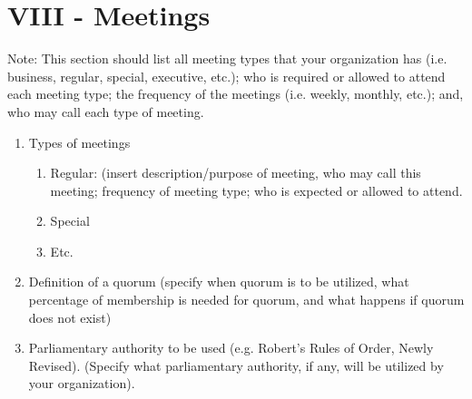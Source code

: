 \documentclass[11pt,a4paper,notitlepage]{article}
\begin{document}
\section*{VIII - Meetings}
Note:  This section should list all meeting types that your organization has
(i.e. business, regular, special, executive, etc.); who is required or allowed
to attend each meeting type; the frequency of the meetings (i.e. weekly,
monthly, etc.); and, who may call each type of meeting. 
\begin{enumerate}
  \item	Types of meetings
    \begin{enumerate}
      \item	Regular:  (insert description/purpose of meeting, who may call this
      meeting; frequency of meeting type; who is expected or allowed to attend.
      \item	Special
      \item	Etc.
    \end{enumerate}
  \item	Definition of a quorum (specify when quorum is to be utilized, what
  percentage of membership is needed for quorum, and what happens if quorum does
  not exist)
  \item	Parliamentary authority to be used (e.g. Robert’s Rules of Order, Newly
  Revised).  (Specify what parliamentary authority, if any, will be utilized by
  your organization).
\end{enumerate}
\end{document}

